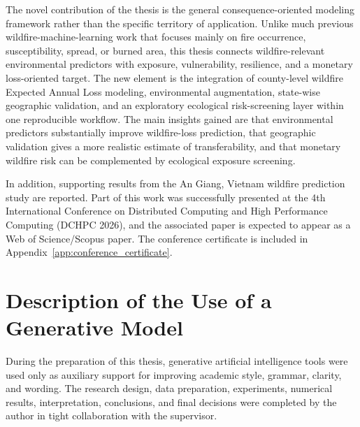 \documentclass[12pt,a4paper]{report}
\begin{document}
The novel contribution of the thesis is the general consequence-oriented modeling framework rather than the specific territory of application. Unlike much previous wildfire-machine-learning work that focuses mainly on fire occurrence, susceptibility, spread, or burned area, this thesis connects wildfire-relevant environmental predictors with exposure, vulnerability, resilience, and a monetary loss-oriented target. The new element is the integration of county-level wildfire Expected Annual Loss modeling, environmental augmentation, state-wise geographic validation, and an exploratory ecological risk-screening layer within one reproducible workflow. The main insights gained are that environmental predictors substantially improve wildfire-loss prediction, that geographic validation gives a more realistic estimate of transferability, and that monetary wildfire risk can be complemented by ecological exposure screening.

In addition, supporting results from the An Giang, Vietnam wildfire prediction study are reported. Part of this work was successfully presented at the 4th International Conference on Distributed Computing and High Performance Computing (DCHPC 2026), and the associated paper is expected to appear as a Web of Science/Scopus paper. The conference certificate is included in Appendix~\ref{app:conference_certificate}.

\chapter*{Description of the Use of a Generative Model}

During the preparation of this thesis, generative artificial intelligence tools were used only as auxiliary support for improving academic style, grammar, clarity, and wording. The research design, data preparation, experiments, numerical results, interpretation, conclusions, and final decisions were completed by the author in tight collaboration with the supervisor.

\tableofcontents
\listoffigures
\listoftables

\clearpage









\appendix




\clearpage

\end{document}
